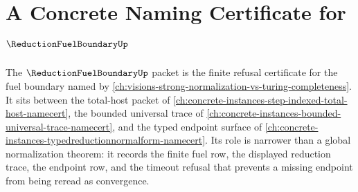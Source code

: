\chapter{A Concrete Naming Certificate for $\ReductionFuelBoundaryUp$}
\label{ch:concrete-instances-reductionfuelboundary-namecert}

The $\ReductionFuelBoundaryUp$ packet is the finite refusal certificate for the fuel boundary named by \autoref{ch:visions-strong-normalization-vs-turing-completeness}. It sits between the total-host packet of \autoref{ch:concrete-instances-step-indexed-total-host-namecert}, the bounded universal trace of \autoref{ch:concrete-instances-bounded-universal-trace-namecert}, and the typed endpoint surface of \autoref{ch:concrete-instances-typedreductionnormalform-namecert}. Its role is narrower than a global normalization theorem: it records the finite fuel row, the displayed reduction trace, the endpoint row, and the timeout refusal that prevents a missing endpoint from being reread as convergence.



